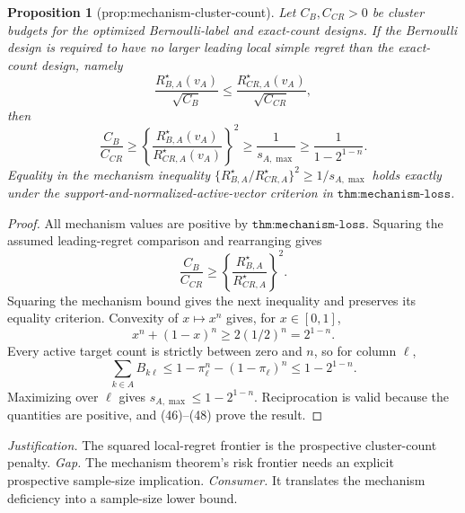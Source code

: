 \documentclass{article}
\newtheorem{proposition}{Proposition}
\begin{document}
\begin{proposition}[prop:mechanism-cluster-count]\label{prop:mechanism-cluster-count}
Let \(C_B,C_{CR}>0\) be cluster budgets for the optimized Bernoulli-label and exact-count designs.  If the Bernoulli design is required to have no larger leading local simple regret than the exact-count design, namely
\[
\frac{R_{B,A}^\star(v_A)}{\sqrt{C_B}}
\leq
\frac{R_{CR,A}^\star(v_A)}{\sqrt{C_{CR}}},
\]
then
\[
\frac{C_B}{C_{CR}}
\geq
\left\{\frac{R_{B,A}^\star(v_A)}{R_{CR,A}^\star(v_A)}\right\}^{2}
\geq\frac1{s_{A,\max}}
\geq\frac1{1-2^{1-n}}.
\]
Equality in the mechanism inequality \(\{R_{B,A}^\star/R_{CR,A}^\star\}^2\geq1/s_{A,\max}\) holds exactly under the support-and-normalized-active-vector criterion in \(\texttt{thm:mechanism-loss}\).
\end{proposition}
\begin{proof}
All mechanism values are positive by \(\texttt{thm:mechanism-loss}\).  Squaring the assumed leading-regret comparison and rearranging gives
\[
\frac{C_B}{C_{CR}}\geq
\left\{\frac{R_{B,A}^\star}{R_{CR,A}^\star}\right\}^{2}. \tag{46}
\]
Squaring the mechanism bound gives the next inequality and preserves its equality criterion.  Convexity of \(x\mapsto x^n\) gives, for \(x\in[0,1]\),
\[
x^n+(1-x)^n\geq2(1/2)^n=2^{1-n}. \tag{47}
\]
Every active target count is strictly between zero and \(n\), so for column \(\ell\),
\[
\sum_{k\in A}B_{k\ell}
\leq1-\pi_\ell^n-(1-\pi_\ell)^n\leq1-2^{1-n}. \tag{48}
\]
Maximizing over \(\ell\) gives \(s_{A,\max}\leq1-2^{1-n}\).  Reciprocation is valid because the quantities are positive, and (46)--(48) prove the result.
\end{proof}
\par\smallskip\noindent \textit{Justification.} The squared local-regret frontier is the prospective cluster-count penalty. \textit{Gap.} The mechanism theorem's risk frontier needs an explicit prospective sample-size implication. \textit{Consumer.} It translates the mechanism deficiency into a sample-size lower bound.
\end{document}
